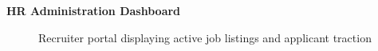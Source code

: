 \documentclass[a4paper,12pt]{report}
\begin{document}
\newpage
\noindent\textbf{HR Administration Dashboard}\\[0.3cm]
\begin{figure}[H]
    \centering
    \caption{Recruiter portal displaying active job listings and applicant traction}
    \label{fig:ss_hr}
\end{figure}
\end{document}
